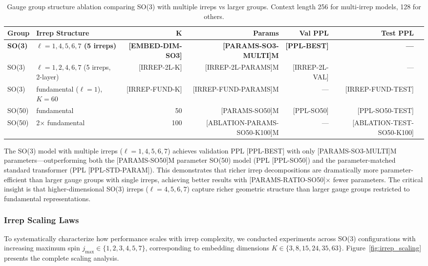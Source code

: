 \documentclass[twoside,11pt]{article}
\begin{document}
\begin{table}[h]
\centering
\small
\caption{Gauge group structure ablation comparing SO(3) with multiple irreps vs larger groups. Context length 256 for multi-irrep models, 128 for others.}
\label{tab:ablation_irrep}
\begin{tabular}{llrrrrr}
\toprule
\textbf{Group} & \textbf{Irrep Structure} & \textbf{K} & \textbf{Params} & \textbf{Val PPL} & \textbf{Test PPL} \\
\midrule
\textbf{SO(3)} & \textbf{$\ell=1,4,5,6,7$ (5 irreps)} & \textbf{[EMBED-DIM-SO3]} & \textbf{[PARAMS-SO3-MULTI]M} & \textbf{[PPL-BEST]} & \textbf{---} \\
SO(3) & $\ell=1,2,4,6,7$ (5 irreps, 2-layer) & [IRREP-2L-K] & [IRREP-2L-PARAMS]M & [IRREP-2L-VAL] & --- \\
SO(3) & fundamental ($\ell=1$), $K=60$ & [IRREP-FUND-K] & [IRREP-FUND-PARAMS]M & --- & [IRREP-FUND-TEST] \\
SO(50) & fundamental & 50 & [PARAMS-SO50]M & [PPL-SO50] & [PPL-SO50-TEST] \\
SO(50) & 2$\times$ fundamental & 100 & [ABLATION-PARAMS-SO50-K100]M & --- & [ABLATION-TEST-SO50-K100] \\
\bottomrule
\end{tabular}
\end{table}

The SO(3) model with multiple irreps ($\ell=1,4,5,6,7$) achieves validation PPL [PPL-BEST] with only [PARAMS-SO3-MULTI]M parameters---outperforming both the [PARAMS-SO50]M parameter SO(50) model (PPL [PPL-SO50]) and the parameter-matched standard transformer (PPL [PPL-STD-PARAM]). This demonstrates that richer irrep decompositions are dramatically more parameter-efficient than larger gauge groups with single irreps, achieving better results with [PARAMS-RATIO-SO50]$\times$ fewer parameters. The critical insight is that higher-dimensional SO(3) irreps ($\ell=4,5,6,7$) capture richer geometric structure than larger gauge groups restricted to fundamental representations.

\subsubsection{Irrep Scaling Laws}

To systematically characterize how performance scales with irrep complexity, we conducted experiments across SO(3) configurations with increasing maximum spin $j_{\max} \in \{1, 2, 3, 4, 5, 7\}$, corresponding to embedding dimensions $K \in \{3, 8, 15, 24, 35, 63\}$. Figure~\ref{fig:irrep_scaling} presents the complete scaling analysis.
\end{document}
